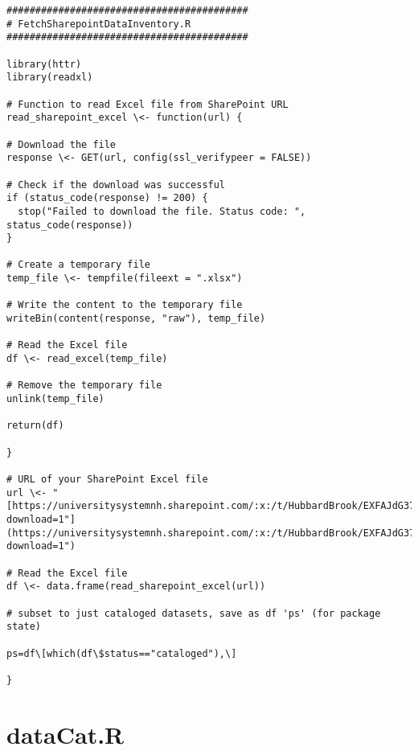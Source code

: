 \documentclass[
  letterpaper,
  DIV=11,
  numbers=noendperiod]{scrreprt}
\begin{document}
\begin{verbatim}
##########################################
# FetchSharepointDataInventory.R
########################################## 

library(httr)
library(readxl)

# Function to read Excel file from SharePoint URL
read_sharepoint_excel \<- function(url) {

# Download the file
response \<- GET(url, config(ssl_verifypeer = FALSE))

# Check if the download was successful
if (status_code(response) != 200) {
  stop("Failed to download the file. Status code: ", status_code(response))
}

# Create a temporary file
temp_file \<- tempfile(fileext = ".xlsx")

# Write the content to the temporary file
writeBin(content(response, "raw"), temp_file)

# Read the Excel file
df \<- read_excel(temp_file)

# Remove the temporary file
unlink(temp_file)

return(df)

}

# URL of your SharePoint Excel file
url \<- "[https://universitysystemnh.sharepoint.com/:x:/t/HubbardBrook/EXFAJdG37VxOsrGI5jMhxmcBc1vTpUnZw1WPtiP3Q5Mc4A?download=1"](https://universitysystemnh.sharepoint.com/:x:/t/HubbardBrook/EXFAJdG37VxOsrGI5jMhxmcBc1vTpUnZw1WPtiP3Q5Mc4A?download=1")

# Read the Excel file
df \<- data.frame(read_sharepoint_excel(url))

# subset to just cataloged datasets, save as df 'ps' (for package
state)

ps=df\[which(df\$status=="cataloged"),\]

}
\end{verbatim}

\section{dataCat.R}\label{datacat.r}
\end{document}
